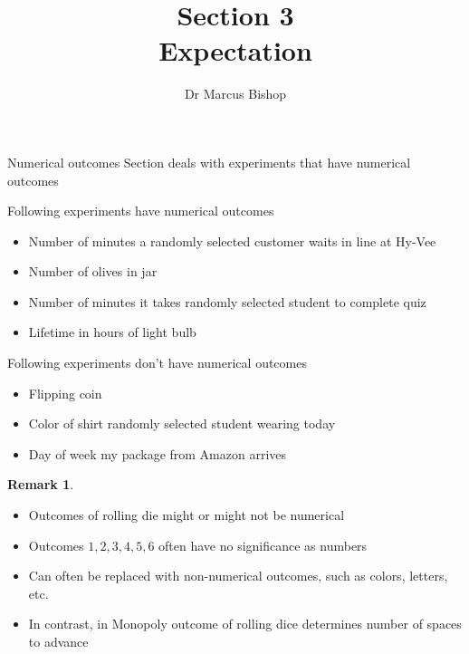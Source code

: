 \documentclass[handout]{beamer}
\title[\S4]{Section 3\\Expectation}
\author{Dr Marcus Bishop}
\theoremstyle{definition}
\newtheorem{remark}{Remark}
\begin{document}
\begin{frame}\titlepage\end{frame}
\LogoOff

\begin{frame}{Numerical outcomes}
Section deals with experiments
that have \alert{numerical outcomes}
\begin{example}
Following experiments have numerical outcomes
\begin{itemize}
\item Number of minutes a randomly selected
customer waits in line at Hy-Vee
\item Number of olives in jar
\item Number of minutes it takes randomly selected
student to complete quiz
\item Lifetime in hours of light bulb
\end{itemize}
\end{example}
\end{frame}

\begin{frame}
\begin{example}
Following experiments \alert{don't} have numerical outcomes
\begin{itemize}
\item Flipping coin
\item Color of shirt randomly selected student wearing today
\item Day of week my package from Amazon arrives
\end{itemize}
\end{example}
\begin{remark}
\begin{itemize}
\item Outcomes of rolling die might or might not be numerical
\item Outcomes $1,2,3,4,5,6$  often have no significance as numbers
\item Can often be replaced with non-numerical outcomes,
such as colors, letters, etc.
\item In contrast, in Monopoly outcome of rolling dice
determines \alert{number} of spaces to advance
\end{itemize}
\end{remark}
\end{frame}
\end{document}
